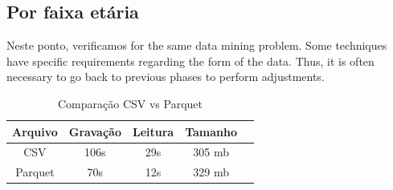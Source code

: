 \subsection{Por faixa etária}

Neste ponto, verificamos for the same data mining problem. Some techniques have specific requirements regarding the form of the data. Thus, it is often necessary to go back to previous phases to perform adjustments.

\begin{table}[htbp]
	\caption{Comparação CSV vs Parquet}
	\begin{center}
		\begin{tabular}{|c|c|c|c|c|}
			\hline
			\textbf{Arquivo} & \textbf{Gravação} & \textbf{Leitura} & \textbf{Tamanho} \\
			\hline
			CSV              & 106s                & 29s              & 305 mb           \\
			\hline
			Parquet          & 70s                 & 12s              & 329 mb           \\
			\hline
		\end{tabular}
		\label{tab1}
	\end{center}
\end{table}

